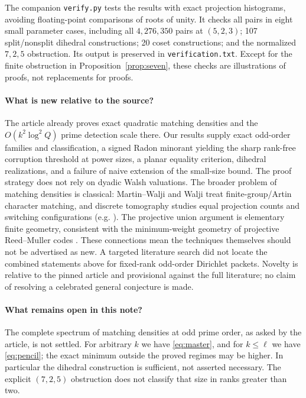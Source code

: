 \documentclass[11pt]{article}
\theoremstyle{remark}\newtheorem{remark}[theorem]{Remark}
\begin{document}
The companion \texttt{verify.py} tests the results with exact projection histograms, avoiding floating-point comparisons of roots of unity. It checks all pairs in eight small parameter cases, including all $4,276,350$ pairs at $(5,2,3)$; 107 split/nonsplit dihedral constructions; 20 coset constructions; and the normalized $7,2,5$ obstruction. Its output is preserved in \texttt{verification.txt}. Except for the finite obstruction in Proposition~\ref{prop:seven}, these checks are illustrations of proofs, not replacements for proofs.

\paragraph{What is new relative to the source?} The article already proves exact quadratic matching densities and the $O(k^2\log^2 Q)$ prime detection scale there. Our results supply exact odd-order families and classification, a signed Radon minorant yielding the sharp rank-free corruption threshold at power sizes, a planar equality criterion, dihedral realizations, and a failure of naive extension of the small-size bound. The proof strategy does not rely on dyadic Walsh valuations. The broader problem of matching densities is classical: Martin--Walji \cite{martinwalji} and Walji \cite{walji} treat finite-group/Artin character matching, and discrete tomography studies equal projection counts and switching configurations (e.g. \cite{tomography,matousek}). The projective union argument is elementary finite geometry, consistent with the minimum-weight geometry of projective Reed--Muller codes \cite{hyperplanes}. These connections mean the techniques themselves should not be advertised as new. A targeted literature search did not locate the combined statements above for fixed-rank odd-order Dirichlet packets. Novelty is relative to the pinned article and provisional against the full literature; no claim of resolving a celebrated general conjecture is made.

\paragraph{What remains open in this note?} The complete spectrum of matching densities at odd prime order, as asked by the article, is not settled. For arbitrary $k$ we have \eqref{eq:master}, and for $k\le\ell$ we have \eqref{eq:pencil}; the exact minimum outside the proved regimes may be higher. In particular the dihedral construction is sufficient, not asserted necessary. The explicit $(7,2,5)$ obstruction does not classify that size in ranks greater than two.
\end{document}
